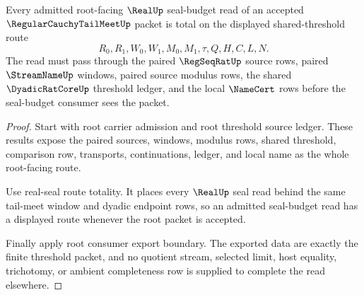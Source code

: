 \begin{theorem}
\label{thm:regular-cauchy-tail-meet-root-seal-budget-totality}
Every admitted root-facing $\RealUp$ seal-budget read of an accepted $\RegularCauchyTailMeetUp$ packet is total on the displayed shared-threshold route
$$
R_0,R_1,W_0,W_1,M_0,M_1,\tau,Q,H,C,L,N.
$$
The read must pass through the paired $\RegSeqRatUp$ source rows, paired $\StreamNameUp$ windows, paired source modulus rows, the shared $\DyadicRatCoreUp$ threshold ledger, and the local $\NameCert$ rows before the seal-budget consumer sees the packet.
\end{theorem}
\begin{proof}
Start with root carrier admission and root threshold source ledger. These results expose the paired sources, windows, modulus rows, shared threshold, comparison row, transports, continuations, ledger, and local name as the whole root-facing route.

Use real-seal route totality. It places every $\RealUp$ seal read behind the same tail-meet window and dyadic endpoint rows, so an admitted seal-budget read has a displayed route whenever the root packet is accepted.

Finally apply root consumer export boundary. The exported data are exactly the finite threshold packet, and no quotient stream, selected limit, host equality, trichotomy, or ambient completeness row is supplied to complete the read elsewhere.
\end{proof}

